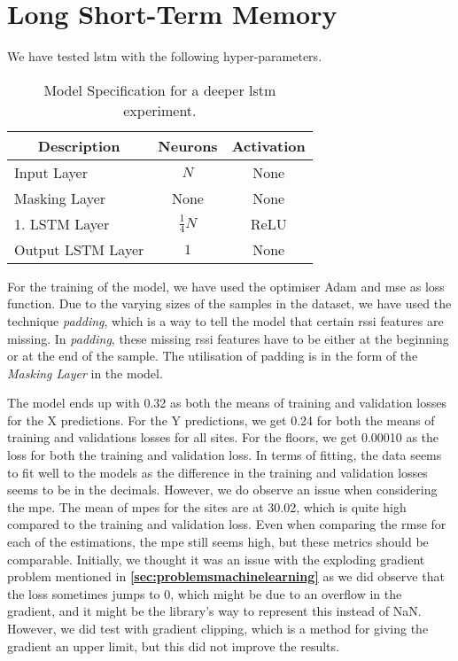 \section{Long Short-Term Memory}
We have tested \gls{lstm} with the following hyper-parameters.

\begin{table}[H]
    \centering
    \caption{Model Specification for a deeper \gls{lstm} experiment.}
    \begin{tabular}{m{}m{} m{}}
        \hline
        \multicolumn{1}{c}{\textbf{Description}} & \multicolumn{1}{c}{\textbf{Neurons}} & \multicolumn{1}{c}{\textbf{Activation}}\\
        \hline
        
        Input Layer         &   \multicolumn{1}{c}{$N$} & \multicolumn{1}{c}{None}        \\
        Masking Layer     & \multicolumn{1}{c}{None}    &  \multicolumn{1}{c}{None}    \\
        1. LSTM Layer     &   \multicolumn{1}{c}{$\frac{1}{4}N$}  & \multicolumn{1}{c}{ReLU}     \\
        Output LSTM Layer         &   \multicolumn{1}{c}{$1$} & \multicolumn{1}{c}{None}        \\
        \hline
    \end{tabular}
    \label{tab:lstm}
\end{table}

For the training of the model, we have used the optimiser Adam and \gls{mse} as loss function. Due to the varying sizes of the samples in the dataset, we have used the technique \textit{padding}, which is a way to tell the model that certain \gls{rssi} features are missing. In \textit{padding}, these missing \gls{rssi} features have to be either at the beginning or at the end of the sample. The utilisation of padding is in the form of the \textit{Masking Layer} in the model.

The model ends up with 0.32 as both the means of training and validation losses for the X predictions. For the Y predictions, we get 0.24 for both the means of training and validations losses for all sites. For the floors, we get 0.00010 as the loss for both the training and validation loss. In terms of fitting, the data seems to fit well to the models as the difference in the training and validation losses seems to be in the decimals. However, we do observe an issue when considering the \gls{mpe}. The mean of \gls{mpe}s for the sites are at 30.02, which is quite high compared to the training and validation loss. Even when comparing the \gls{rmse} for each of the estimations, the \gls{mpe} still seems high, but these metrics should be comparable. Initially, we thought it was an issue with the exploding gradient problem mentioned in \textbf{\autoref{sec:problemsmachinelearning}} as we did observe that the loss sometimes jumps to 0, which might be due to an overflow in the gradient, and it might be the library's way to represent this instead of NaN. However, we did test with gradient clipping, which is a method for giving the gradient an upper limit, but this did not improve the results. 

